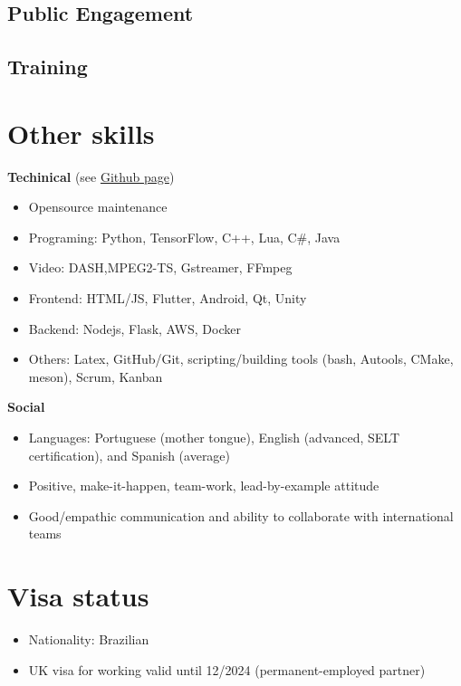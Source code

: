 \documentclass[10pt,a4paper,sans,colorlinks]{moderncv}
\begin{document}
\subsection{Public Engagement}
  
\subsection{Training}

\section{Other skills}

\textbf{Techinical} (see \href{https://github.com/alanlivio}{Github page})
  \begin{itemize}[mynosep]
    \item Opensource maintenance
    \item Programing: Python, TensorFlow, C++, Lua, C\#, Java
    \item Video: DASH,MPEG2-TS, Gstreamer, FFmpeg
    \item Frontend: HTML/JS, Flutter, Android, Qt, Unity
    \item Backend: Nodejs, Flask, AWS, Docker
    \item Others: Latex, GitHub/Git, scripting/building tools (bash, Autools, CMake, meson), Scrum, Kanban
  \end{itemize}
  
\textbf{Social}
  \begin{itemize}[mynosep]
    \item Languages: Portuguese (mother tongue), English (advanced, SELT certification), and Spanish (average)
    \item Positive, make-it-happen, team-work, lead-by-example attitude
    \item Good/empathic communication and ability to collaborate with international teams
  \end{itemize}

\section{Visa status}
  \begin{itemize}[mynosep]
    \item Nationality: Brazilian
    \item UK visa for working valid until 12/2024 (permanent-employed partner)
  \end{itemize}
\end{document}
